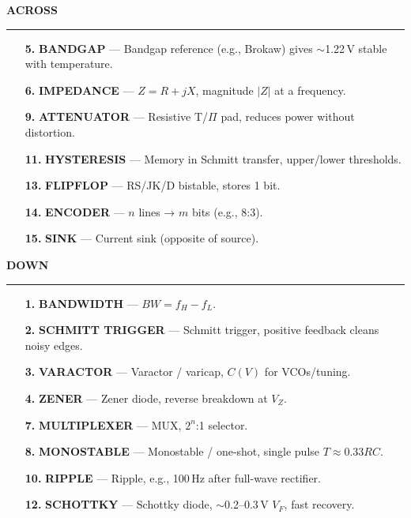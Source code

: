 \begin{tcolorbox}[
  colback=SoftBlue,
  colframe=IEEEblue!70!black,
  boxrule=0.5pt,
  arc=0mm,
  left=4mm, right=4mm, top=1.5mm, bottom=1.5mm
]
\medskip
\noindent
\begin{minipage}[t]{0.485\textwidth}
  {\small\bfseries\rmfamily\color{IEEEblue} ACROSS}\par
  \vspace{0.15em}
  {\color{black!15}\hrule height 0.4pt}\par
  \smallskip
  \begin{enumerate}[leftmargin=1.8em,itemsep=0.5pt,topsep=0pt,parsep=0pt, label=\textbf{\arabic*.}]
    \item[\textbf{5.}] \textbf{BANDGAP} — Bandgap reference (e.g., Brokaw) gives $\sim$1.22\,V stable with temperature.
    \item[\textbf{6.}] \textbf{IMPEDANCE} — $Z = R + jX$, magnitude $|Z|$ at a frequency.
    \item[\textbf{9.}] \textbf{ATTENUATOR} — Resistive T/$\Pi$ pad, reduces power without distortion.
    \item[\textbf{11.}] \textbf{HYSTERESIS} — Memory in Schmitt transfer, upper/lower thresholds.
    \item[\textbf{13.}] \textbf{FLIPFLOP} — RS/JK/D bistable, stores 1 bit.
    \item[\textbf{14.}] \textbf{ENCODER} — $n$ lines → $m$ bits (e.g., 8:3).
    \item[\textbf{15.}] \textbf{SINK} — Current sink (opposite of source).
  \end{enumerate}
\end{minipage}%
\hfill
\begin{minipage}[t]{0.485\textwidth}
  {\small\bfseries\rmfamily\color{IEEEblue} DOWN}\par
  \vspace{0.15em}
  {\color{black!15}\hrule height 0.4pt}\par
  \smallskip
  \begin{enumerate}[leftmargin=1.8em,itemsep=0.5pt,topsep=0pt,parsep=0pt, label=\textbf{\arabic*.}]
    \item[\textbf{1.}] \textbf{BANDWIDTH} — $BW = f_H - f_L$.
    \item[\textbf{2.}] \textbf{SCHMITT TRIGGER} — Schmitt trigger, positive feedback cleans noisy edges.
    \item[\textbf{3.}] \textbf{VARACTOR} — Varactor / varicap, $C(V)$ for VCOs/tuning.
    \item[\textbf{4.}] \textbf{ZENER} — Zener diode, reverse breakdown at $V_Z$.
    \item[\textbf{7.}] \textbf{MULTIPLEXER} — MUX, $2^n$:1 selector.
    \item[\textbf{8.}] \textbf{MONOSTABLE} — Monostable / one-shot, single pulse $T\approx0.33RC$.
    \item[\textbf{10.}] \textbf{RIPPLE} — Ripple, e.g., 100\,Hz after full-wave rectifier.
    \item[\textbf{12.}] \textbf{SCHOTTKY} — Schottky diode, $\sim$0.2–0.3\,V $V_F$, fast recovery.
  \end{enumerate}
\end{minipage}


\end{tcolorbox}
